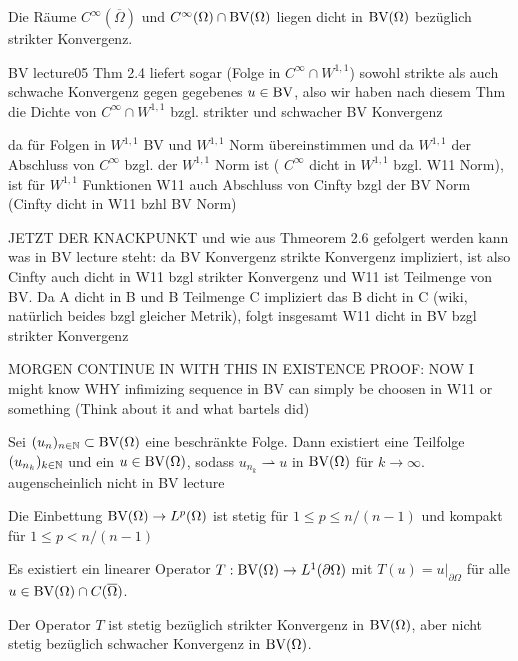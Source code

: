 \begin{theorem}
  \label{thm:approximationBySmoothFunctions}
  Die Räume $C^\infty(\overline\Omega)$ und $C^\infty(\Omega)\cap\textup{BV}(\Omega)$
  liegen dicht in $\textup{BV}(\Omega)$ bezüglich strikter Konvergenz.

  {\color{red}BV lecture05 Thm 2.4 liefert sogar (Folge in
  $C^\infty\cap W^{1,1}$) sowohl strikte als auch schwache Konvergenz gegen
  gegebenes $u\in\textup{BV}$, also wir haben nach diesem Thm die Dichte von
  $C^\infty\cap W^{1,1}$ bzgl. strikter und schwacher BV Konvergenz
  
  da für Folgen in $W^{1,1}$ BV und $W^{1,1}$ Norm übereinstimmen und da
  $W^{1,1}$ der Abschluss von $C^\infty$ bzgl. der $W^{1,1}$ Norm ist (
  $C^\infty$ dicht in $W^{ 1,1 }$ bzgl. W11 Norm), ist
  für $W^{1,1}$ Funktionen W11 auch Abschluss von Cinfty bzgl
  der BV Norm (Cinfty dicht in W11 bzhl BV Norm)
  
  JETZT DER KNACKPUNKT und wie aus Thmeorem 2.6 gefolgert werden kann was in BV lecture
  steht: da BV Konvergenz strikte Konvergenz impliziert, ist 
  also Cinfty auch dicht in W11 bzgl strikter Konvergenz und W11 ist Teilmenge
  von BV. Da A dicht in B und B Teilmenge C impliziert das B dicht in C (wiki,
  natürlich beides bzgl gleicher Metrik), folgt insgesamt W11 dicht in BV bzgl
  strikter Konvergenz
  
  MORGEN CONTINUE IN WITH THIS IN EXISTENCE PROOF: NOW I might know WHY
  infimizing sequence in BV can simply be choosen in W11 or something
  (Think about it and what bartels did)}
\end{theorem}

\begin{theorem}
  \label{thm:compactness}
  Sei $(u_n)_{n\in\mathbb{N}}\subset \textup{BV}(\Omega)$ eine beschränkte Folge. Dann 
  existiert eine Teilfolge $(u_{n_k})_{k\in\mathbb{N}}$ und ein $u\in\textup{BV}(\Omega)$,
  sodass $u_{n_k}\rightharpoonup u$ in $\textup{BV}(\Omega)$ für $k\rightarrow\infty$.
  {\color{red}augenscheinlich nicht in BV lecture}
\end{theorem}

\begin{theorem}
  \label{thm:embeddingBVintoLp}
  Die Einbettung $\textup{BV}(\Omega)\to L^p(\Omega)$ ist stetig für 
  $1\leq p\leq n/(n-1)$ und kompakt für $1\leq p< n/(n-1)$
\end{theorem}

\begin{theorem}[Spuroperator]
  \label{thm:traceOperator}
  Es existiert ein linearer Operator $T:\textup{BV}(\Omega)\to L^1(\partial\Omega)$
  mit $T(u) = u|_{\partial\Omega}$ für alle $u\in\textup{BV}(\Omega)\cap
  C(\overline\Omega)$.

  Der Operator $T$ ist stetig bezüglich strikter Konvergenz in $\textup{BV}(\Omega)$,
  aber nicht stetig bezüglich schwacher Konvergenz in $\textup{BV}(\Omega)$. 
\end{theorem}
